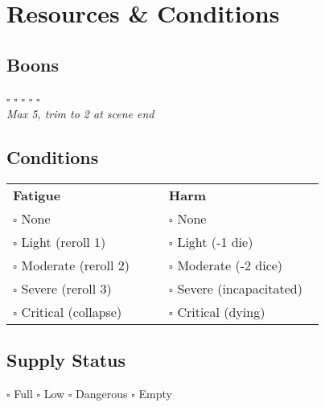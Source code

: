 \begin{minipage}[t]{0.49\textwidth}
\section*{Resources \& Conditions}

\subsection*{Boons}
$\square$ $\square$ $\square$ $\square$ $\square$ \\
\textit{Max 5, trim to 2 at scene end}

\subsection*{Conditions}
\begin{tabularx}{\linewidth}{@{}L{0.47\linewidth}L{0.47\linewidth}@{}}
\textbf{Fatigue} & \textbf{Harm}\\
$\square$ None & $\square$ None\\
$\square$ Light (reroll 1) & $\square$ Light (-1 die)\\
$\square$ Moderate (reroll 2) & $\square$ Moderate (-2 dice)\\
$\square$ Severe (reroll 3) & $\square$ Severe (incapacitated)\\
$\square$ Critical (collapse) & $\square$ Critical (dying)\\
\end{tabularx}

\subsection*{Supply Status}
$\square$ Full \quad $\square$ Low \quad $\square$ Dangerous \quad $\square$ Empty
\end{minipage}\hfill
